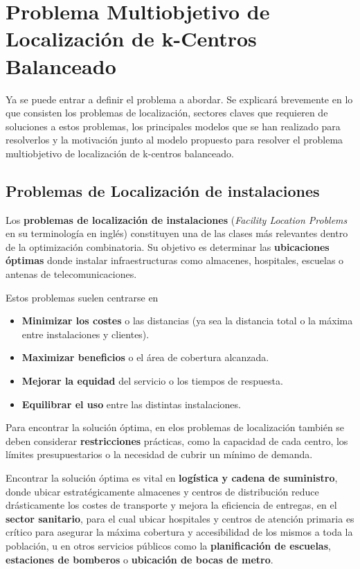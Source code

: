 \documentclass[12pt,a4paper]{book}
\begin{document}
\chapter{Problema Multiobjetivo de Localización de k-Centros Balanceado}

Ya se puede entrar a definir el problema a abordar. Se explicará brevemente en lo que consisten los problemas de localización, sectores claves que requieren de soluciones a 
estos problemas, los principales modelos que se han realizado para resolverlos y la motivación junto al modelo propuesto para resolver el problema multiobjetivo de localización de k-centros balanceado.

\section{Problemas de Localización de instalaciones}

Los \textbf{problemas de localización de instalaciones} (\textit{Facility Location Problems} en su terminología en inglés) constituyen una de las clases más relevantes dentro de la optimización combinatoria. Su objetivo es determinar las \textbf{ubicaciones óptimas} donde instalar infraestructuras como almacenes, hospitales, escuelas o antenas de telecomunicaciones.

Estos problemas suelen centrarse en
\begin{itemize}
    \item \textbf{Minimizar los costes} o las distancias (ya sea la distancia total o la máxima entre instalaciones y clientes).
    \item \textbf{Maximizar beneficios} o el área de cobertura alcanzada.
    \item \textbf{Mejorar la equidad} del servicio o los tiempos de respuesta.
    \item \textbf{Equilibrar el uso} entre las distintas instalaciones.
\end{itemize}

Para encontrar la solución óptima, en elos problemas de localización también se deben considerar \textbf{restricciones} prácticas, como la capacidad de cada centro, los límites presupuestarios o la necesidad de cubrir un mínimo de demanda.

Encontrar la solución óptima es vital en \textbf{logística y cadena de suministro}, donde ubicar estratégicamente almacenes y centros
de distribución reduce drásticamente los costes de transporte y mejora la eficiencia de entregas, en el \textbf{sector sanitario}, para el cual ubicar hospitales y centros de atención primaria es crítico para
asegurar la máxima cobertura y accesibilidad de los mismos a toda la población, u en otros servicios públicos como la \textbf{planificación de escuelas}, \textbf{estaciones de bomberos} o \textbf{ubicación de bocas de metro}.
\end{document}

